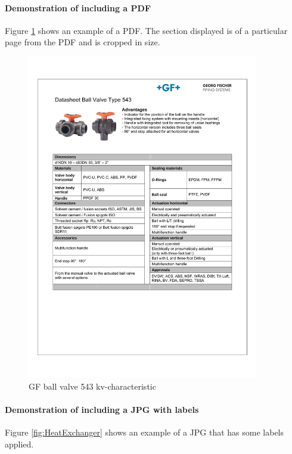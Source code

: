 \paragraph{Demonstration of including a PDF}
Figure \ref{fig:GF543kv} shows an example of a PDF. The section displayed is of a particular page from the PDF and is cropped in size.
\begin{figure}
	\centering
	\includegraphics[width=0.9\textwidth,page=6, trim = 25mm 172mm 25mm 45mm, clip]{600-Appendices/Examples/Datasheet_GF_543}
	\caption{GF ball valve 543 kv-characteristic}
	\label{fig:GF543kv}
\end{figure}

\paragraph{Demonstration of including a JPG with labels}
Figure \ref{fig:HeatExchanger} shows an example of a JPG that has some labels applied.

